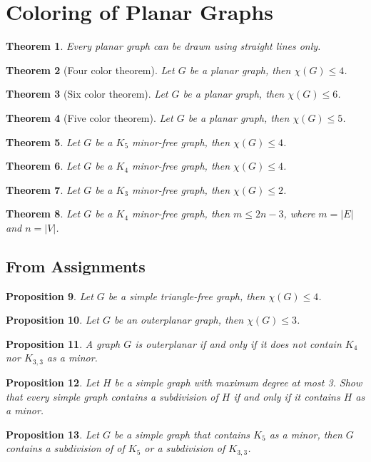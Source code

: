 \documentclass[paper=a4, fontsize=12pt]{scrartcl} %
\newtheorem{thm}{Theorem}[section]
\newtheorem{prop}[thm]{Proposition}
\theoremstyle{definition}
\theoremstyle{remark}
\numberwithin{equation}{section} %
\numberwithin{figure}{section} %
\numberwithin{table}{section} %
\begin{document}
\section{Coloring of Planar Graphs}
\begin{thm}
	Every planar graph can be drawn using straight lines only.
\end{thm}
\begin{thm}[Four color theorem]
	Let $G$ be a planar graph, then $\chi(G) \leq 4$.
\end{thm}
\begin{thm}[Six color theorem]
	Let $G$ be a planar graph, then $\chi(G) \leq 6$.
\end{thm}
\begin{thm}[Five color theorem]
	Let $G$ be a planar graph, then $\chi(G) \leq 5$.
\end{thm}
\begin{thm}
	Let $G$ be a $K_5$ minor-free graph, then $\chi(G) \leq 4$.
\end{thm}
\begin{thm}
	Let $G$ be a $K_4$ minor-free graph, then $\chi(G) \leq 4$.
\end{thm}
\begin{thm}
	Let $G$ be a $K_3$ minor-free graph, then $\chi(G) \leq 2$.
\end{thm}
\begin{thm}
	Let $G$ be a $K_4$ minor-free graph, then $m \leq 2n-3$, where $m = |E|$ and $n = |V|$.
\end{thm}
\subsection{From Assignments}
\begin{prop}
	Let $G$ be a simple triangle-free graph, then $\chi(G) \leq 4$.
\end{prop}
\begin{prop}
	Let $G$ be an outerplanar graph, then $\chi(G) \leq 3$.
\end{prop}
\begin{prop}
	A graph $G$ is outerplanar if and only if it does not contain $K_4$ nor $K_{3,3}$ as a minor.
\end{prop}
\begin{prop}
	Let $H$ be a simple graph with maximum degree at most 3.  Show that every simple graph contains a subdivision of $H$ if and only if it contains $H$ as a minor.
\end{prop}
\begin{prop}
	Let $G$ be a simple graph that contains $K_5$ as a minor, then $G$ contains a subdivision of of $K_5$ or a subdivision of $K_{3,3}$.
\end{prop}
\end{document}
